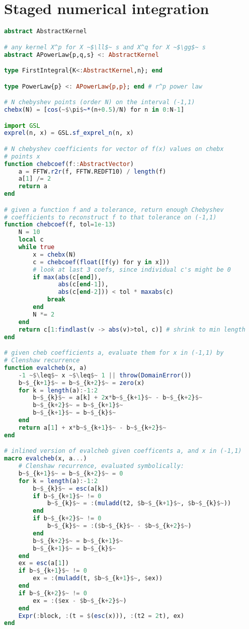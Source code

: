 \chapter{Staged numerical integration}
\label{appendix:integration}

\begin{singlespace}
\begin{lstlisting}[language=julia]
abstract AbstractKernel

# any kernel X^p for X ~$\ll$~ s and X^q for X ~$\gg$~ s
abstract APowerLaw{p,q,s} <: AbstractKernel

type FirstIntegral{K<:AbstractKernel,n}; end

type PowerLaw{p} <: APowerLaw{p,p}; end # r^p power law

# N chebyshev points (order N) on the interval (-1,1)
chebx(N) = [cos(~$\pi$~*(n+0.5)/N) for n in 0:N-1]

import GSL
exprel(n, x) = GSL.sf_exprel_n(n, x)

# N chebyshev coefficients for vector of f(x) values on chebx
# points x
function chebcoef(f::AbstractVector)
    a = FFTW.r2r(f, FFTW.REDFT10) / length(f)
    a[1] /= 2
    return a
end

# given a function f and a tolerance, return enough Chebyshev
# coefficients to reconstruct f to that tolerance on (-1,1)
function chebcoef(f, tol=1e-13)
    N = 10
    local c
    while true
        x = chebx(N)
        c = chebcoef(float([f(y) for y in x]))
        # look at last 3 coefs, since individual c's might be 0
        if max(abs(c[end]),
               abs(c[end-1]),
               abs(c[end-2])) < tol * maxabs(c)
            break
        end
        N *= 2
    end
    return c[1:findlast(v -> abs(v)>tol, c)] # shrink to min length
end

# given cheb coefficients a, evaluate them for x in (-1,1) by
# Clenshaw recurrence
function evalcheb(x, a)
    -1 ~$\leq$~ x ~$\leq$~ 1 || throw(DomainError())
    b~$_{k+1}$~ = b~$_{k+2}$~ = zero(x)
    for k = length(a):-1:2
        b~$_{k}$~ = a[k] + 2x*b~$_{k+1}$~ - b~$_{k+2}$~
        b~$_{k+2}$~ = b~$_{k+1}$~
        b~$_{k+1}$~ = b~$_{k}$~
    end
    return a[1] + x*b~$_{k+1}$~ - b~$_{k+2}$~
end

# inlined version of evalcheb given coefficents a, and x in (-1,1)
macro evalcheb(x, a...)
    # Clenshaw recurrence, evaluated symbolically:
    b~$_{k+1}$~ = b~$_{k+2}$~ = 0
    for k = length(a):-1:2
        b~$_{k}$~ = esc(a[k])
        if b~$_{k+1}$~ != 0
            b~$_{k}$~ = :(muladd(t2, $b~$_{k+1}$~, $b~$_{k}$~))
        end
        if b~$_{k+2}$~ != 0
            b~$_{k}$~ = :($b~$_{k}$~ - $b~$_{k+2}$~)
        end
        b~$_{k+2}$~ = b~$_{k+1}$~
        b~$_{k+1}$~ = b~$_{k}$~
    end
    ex = esc(a[1])
    if b~$_{k+1}$~ != 0
        ex = :(muladd(t, $b~$_{k+1}$~, $ex))
    end
    if b~$_{k+2}$~ != 0
        ex = :($ex - $b~$_{k+2}$~)
    end
    Expr(:block, :(t = $(esc(x))), :(t2 = 2t), ex)
end


\end{lstlisting}
\end{singlespace}
